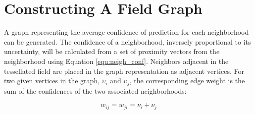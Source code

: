 \chapter{Constructing A Field Graph}
A graph representing the average confidence of prediction for each neighborhood can be generated. The confidence of a neighborhood, inversely proportional to its uncertainty, will be calculated from a set of proximity vectors from the neighborhood using Equation \ref{equ:neigh_conf}. Neighbors adjacent in the tessellated field are placed in the graph representation as adjacent vertices. For two given vertices in the graph, $\upsilon_i$ and $\upsilon_j$, the corresponding edge weight is the sum of the confidences of the two associated neighborhoods:

\begin{equation}
    w_{ij} = w_{ji} = \nu_i + \nu_j
\end{equation}

